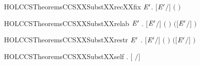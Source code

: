 \newcommand{\HOLCCSTheoremsCCSXXSubstXXrec}{\UseVerbatim{HOLCCSTheoremsCCSXXSubstXXrec}}
\begin{SaveVerbatim}{HOLCCSTheoremsCCSXXSubstXXrecXXfix}
\HOLTokenTurnstile{} \HOLSymConst{\HOLTokenForall{}}  \ensuremath{\HOLBoundVar{E}\sp{\prime}}. \ensuremath{[}\ensuremath{\HOLBoundVar{E}\sp{\prime}}\ensuremath{/}\ensuremath{]} \ensuremath{(}  \ensuremath{)} \HOLSymConst{\ensuremath{=}}   
\end{SaveVerbatim}
\newcommand{\HOLCCSTheoremsCCSXXSubstXXrecXXfix}{\UseVerbatim{HOLCCSTheoremsCCSXXSubstXXrecXXfix}}
\begin{SaveVerbatim}{HOLCCSTheoremsCCSXXSubstXXrelab}
\HOLTokenTurnstile{} \HOLSymConst{\HOLTokenForall{}}  \ensuremath{\HOLBoundVar{E}\sp{\prime}} . \ensuremath{[}\ensuremath{\HOLBoundVar{E}\sp{\prime}}\ensuremath{/}\ensuremath{]} \ensuremath{(}  \ensuremath{)} \HOLSymConst{\ensuremath{=}}  \ensuremath{(}\ensuremath{[}\ensuremath{\HOLBoundVar{E}\sp{\prime}}\ensuremath{/}\ensuremath{]} \ensuremath{)} 
\end{SaveVerbatim}
\newcommand{\HOLCCSTheoremsCCSXXSubstXXrelab}{\UseVerbatim{HOLCCSTheoremsCCSXXSubstXXrelab}}
\begin{SaveVerbatim}{HOLCCSTheoremsCCSXXSubstXXrestr}
\HOLTokenTurnstile{} \HOLSymConst{\HOLTokenForall{}}  \ensuremath{\HOLBoundVar{E}\sp{\prime}} . \ensuremath{[}\ensuremath{\HOLBoundVar{E}\sp{\prime}}\ensuremath{/}\ensuremath{]} \ensuremath{(}  \ensuremath{)} \HOLSymConst{\ensuremath{=}}   \ensuremath{(}\ensuremath{[}\ensuremath{\HOLBoundVar{E}\sp{\prime}}\ensuremath{/}\ensuremath{]} \ensuremath{)}
\end{SaveVerbatim}
\newcommand{\HOLCCSTheoremsCCSXXSubstXXrestr}{\UseVerbatim{HOLCCSTheoremsCCSXXSubstXXrestr}}
\begin{SaveVerbatim}{HOLCCSTheoremsCCSXXSubstXXself}
\HOLTokenTurnstile{} \HOLSymConst{\HOLTokenForall{}} . \ensuremath{[} \ensuremath{/}\ensuremath{]}  \HOLSymConst{\ensuremath{=}} 
\end{SaveVerbatim}
